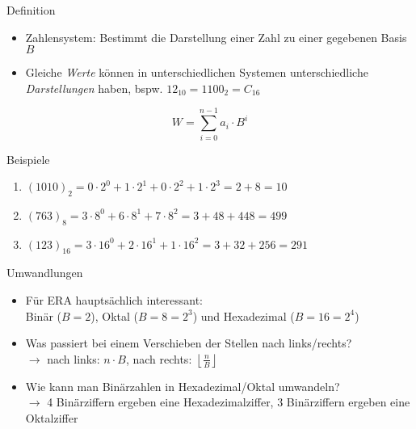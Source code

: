 \documentclass[
  german,            %
  aspectratio=169,    %
]{tumbeamer}
\begin{document}
\begin{frame}[c]{Definition}{}
	\begin{itemize}
		\item Zahlensystem: Bestimmt die Darstellung einer Zahl zu einer gegebenen Basis $B$
		\item Gleiche \emph{Werte} können in unterschiedlichen Systemen unterschiedliche \emph{Darstellungen} haben, bspw. $12_{10}=1100_2=C_{16}$
	\end{itemize}
	
	\begin{equation}
		W=\sum_{i=0}^{n-1}a_i\cdot B^i
	\end{equation}
	
	\hspace{1cm}
	
	\begin{block}{Beispiele}
		\begin{enumerate}
			\item $(1010)_2 = 0\cdot 2^0+1\cdot 2^1+0\cdot 2^2+1\cdot 2^3=2+8=10$
			\item $(763)_8 = 3\cdot 8^0+6\cdot 8^1+7\cdot 8^2=3+48+448=499$
			\item $(123)_{16} = 3\cdot 16^0+2\cdot 16^1+1\cdot 16^2=3+32+256=291$
		\end{enumerate}
	\end{block}
\end{frame}

\begin{frame}[c]{Umwandlungen}{}
	\begin{itemize}
		\item Für ERA hauptsächlich interessant:\\Binär ($B=2$), Oktal ($B=8=2^3$) und Hexadezimal ($B=16=2^4$)
		\item Was passiert bei einem Verschieben der Stellen nach links/rechts?\pause\\
		$\rightarrow$ nach links: $n\cdot B$, nach rechts: $\left\lfloor{\frac{n}{B}}\right\rfloor$
		\item Wie kann man Binärzahlen in Hexadezimal/Oktal umwandeln?\pause\\
		$\rightarrow$ 4 Binärziffern ergeben eine Hexadezimalziffer, 3 Binärziffern ergeben eine Oktalziffer
	\end{itemize}
\end{frame}
\end{document}
